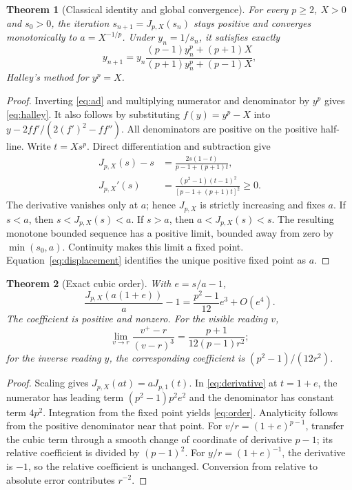 \documentclass[11pt,a4paper]{article}
\newtheorem{theorem}{Theorem}[section]
\theoremstyle{remark}\newtheorem{remark}[theorem]{Remark}
\numberwithin{equation}{section}
\newcommand{\AD}{J_{p,X}}
\begin{document}
\begin{theorem}[Classical identity and global convergence]\label{thm:global}
For every $p\ge2$, $X>0$ and $s_0>0$, the iteration $s_{n+1}=\AD(s_n)$ stays positive and converges monotonically to $a=X^{-1/p}$. Under $y_n=1/s_n$, it satisfies exactly
\begin{equation}
 y_{n+1}=y_n\frac{(p-1)y_n^p+(p+1)X}{(p+1)y_n^p+(p-1)X},\label{eq:halley}
\end{equation}
Halley's method for $y^p=X$.
\end{theorem}
\begin{proof}
Inverting \eqref{eq:ad} and multiplying numerator and denominator by $y^p$ gives \eqref{eq:halley}. It also follows by substituting $f(y)=y^p-X$ into
$y-2ff'/(2(f')^2-ff'')$.
All denominators are positive on the positive half-line. Write $t=Xs^p$. Direct differentiation and subtraction give
\begin{align}
 \AD(s)-s&=\frac{2s(1-t)}{p-1+(p+1)t},\label{eq:displacement}\\
 \AD'(s)&=\frac{(p^2-1)(t-1)^2}{[p-1+(p+1)t]^2}\ge0.\label{eq:derivative}
\end{align}
The derivative vanishes only at $a$; hence $\AD$ is strictly increasing and fixes $a$. If $s<a$, then $s<\AD(s)<a$. If $s>a$, then $a<\AD(s)<s$. The resulting monotone bounded sequence has a positive limit, bounded away from zero by $\min(s_0,a)$. Continuity makes this limit a fixed point. Equation~\eqref{eq:displacement} identifies the unique positive fixed point as $a$.
\end{proof}

\begin{theorem}[Exact cubic order]\label{thm:cubic}
With $e=s/a-1$,
\begin{equation}
 \frac{\AD(a(1+e))}{a}-1=\frac{p^2-1}{12}e^3+O(e^4).\label{eq:order}
\end{equation}
The coefficient is positive and nonzero. For the visible reading $v$,
\begin{equation}
 \lim_{v\to r}\frac{v^+-r}{(v-r)^3}=\frac{p+1}{12(p-1)r^2};
\end{equation}
for the inverse reading $y$, the corresponding coefficient is $(p^2-1)/(12r^2)$.
\end{theorem}
\begin{proof}
Scaling gives $\AD(at)=aJ_{p,1}(t)$. In \eqref{eq:derivative} at $t=1+e$, the numerator has leading term $(p^2-1)p^2e^2$ and the denominator has constant term $4p^2$. Integration from the fixed point yields \eqref{eq:order}. Analyticity follows from the positive denominator near that point. For $v/r=(1+e)^{p-1}$, transfer the cubic term through a smooth change of coordinate of derivative $p-1$; its relative coefficient is divided by $(p-1)^2$. For $y/r=(1+e)^{-1}$, the derivative is $-1$, so the relative coefficient is unchanged. Conversion from relative to absolute error contributes $r^{-2}$.
\end{proof}
\end{document}
